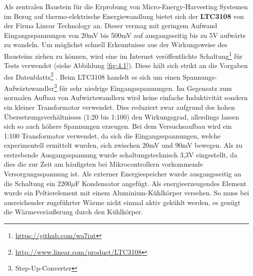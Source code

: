 \documentclass[11pt]{scrreprt} %
\begin{document}
Als zentralen Baustein für die Erprobung von Micro-Energy-Harvesting Systemen im Bezug auf thermo-elektrische Energiewandlung bietet sich der \textbf{LTC3108} von der Firma Linear Technology an. Dieser vermag mit geringem Aufwand Eingangsspannungen von 20mV bis 500mV auf ausgangsseitig bis zu 5V aufwärts zu wandeln. Um möglichst schnell Erkenntnisse aus der Wirkungsweise des Bausteins ziehen zu können, wird eine im Internet veröffentlichte Schaltung\footnote{\url{https://github.com/wa7iut}} für Tests verwendet (siehe Abbildung \vref{fig:4.1}). Diese hält sich strikt an die Vorgaben des Datenblatts\footnote{\url{http://www.linear.com/product/LTC3108}} \citep{LTC3108}. Beim LTC3108 handelt es sich um einen Spannungs-Aufwärtswandler\footnote{Step-Up-Converter} für sehr niedrige Eingangsspannungen. Im Gegensatz zum normalen Aufbau von Aufwärtswandlern wird keine einfache Induktivität sondern ein kleiner Transformator verwendet. Dies reduziert zwar aufgrund des hohen Übersetzungsverhältnisses (1:20 bis 1:100) den Wirkungsgrad, allerdings lassen sich so auch höhere Spannungen erzeugen. Bei dem Versuchsaufbau wird ein 1:100 Transformator verwendet, da sich die Eingangsspannungen, welche experimentell ermittelt wurden, sich zwischen 20mV und 90mV bewegen. Als zu erstrebende Ausgangsspannung wurde schaltungstechnisch 3,3V eingestellt, da dies die zur Zeit am häufigsten bei Mikrocontrollern vorkommende Versorgungsspannung ist. Als externer Energiespeicher wurde ausgangsseitig an die Schaltung ein $2200 \mu$F Kondensator angefügt. Als energieerzeugendes Element wurde ein Peltierelement mit einem Aluminium-Kühlkörper versehen. So muss bei ausreichender zugeführter Wärme nicht einmal aktiv gekühlt werden, es genügt die Wärmeveräußerung durch den Kühlkörper.%
\end{document}
